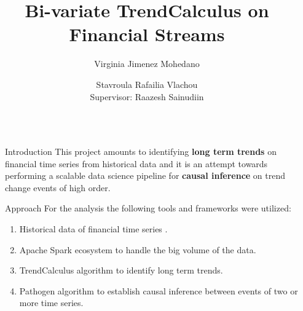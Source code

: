 \documentclass[final]{beamer}
\title{\fontsize{65}{0}\selectfont Bi-variate TrendCalculus on Financial Streams}
\author{\fontsize{30pt}{20pt}\selectfont Virginia Jimenez Mohedano \and Stavroula Rafailia Vlachou \\
\vspace*{0.2in}
\fontsize{25pt}{20pt}\selectfont Supervisor: Raazesh Sainudiin}
\newlength{\sepwidth}
\newlength{\colwidth}
\newcommand{\separatorcolumn}{\begin{column}{\sepwidth}\end{column}}
\begin{document}
\begin{frame}[fragile]
\begin{columns}[t]
\separatorcolumn

\begin{column}{\colwidth}

  \begin{block}{Introduction}
    This project amounts to identifying \textsf{\textbf{long term trends}} on financial time series from historical data and it is an attempt towards performing a scalable data science pipeline for \textsf{\textbf{causal inference}} on trend change events of high order. 
  \end{block}
  
  \begin{block}{Approach}
  For the analysis the following tools and frameworks were utilized:
    \begin{enumerate}
        \item Historical data of financial time series \cite{HistData}.
        \item Apache Spark ecosystem to handle the big volume of the data. 
        \item TrendCalculus algorithm \cite{TrendCalculus} to identify long term trends.
        \item Pathogen algorithm \cite{Pathogen} to establish causal inference between events of two or more time series. 
    \end{enumerate}
  \end{block}


\end{column}
\end{columns}
\end{frame}
\end{document}

